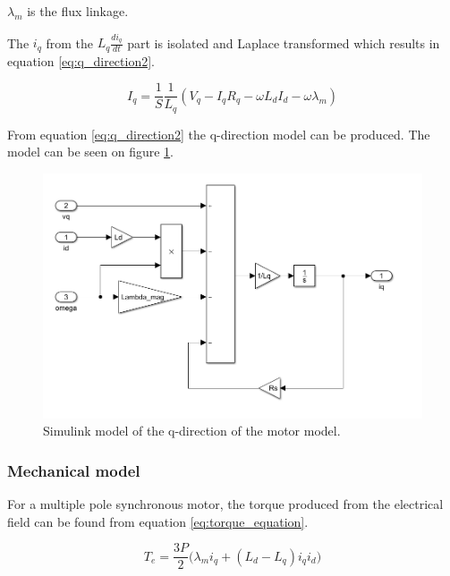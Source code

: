 
$\lambda_m$ is the flux linkage.

The $i_q$ from the $L_q \frac{di_q}{dt}$ part is isolated and Laplace transformed which results in equation \ref{eq:q_direction2}.

\begin{equation}
    \label{eq:q_direction2}
    I_q = \frac{1}{S} \frac{1}{L_q} (V_q - I_q R_q - \omega L_d I_d - \omega \lambda_m)
\end{equation}

From equation \ref{eq:q_direction2} the q-direction model can be produced. The model can be seen on figure \ref{fig:simulink_q_direction}.

\begin{figure}[H]
	\centering
	\includegraphics[width=0.95\linewidth]{pictures/control/simulink_q_direction.PNG}
	\caption{Simulink model of the q-direction of the motor model.}
	\label{fig:simulink_q_direction}
\end{figure}


\subsubsection{Mechanical model}
For a multiple pole synchronous motor, the torque produced from the electrical field can be found from equation \ref{eq:torque_equation}.

\begin{equation}
    \label{eq:torque_equation}
    T_e = \frac{3P}{2} \big(\lambda_m i_{q} + (L_d - L_q) i_q i_{d}\big)
\end{equation}

